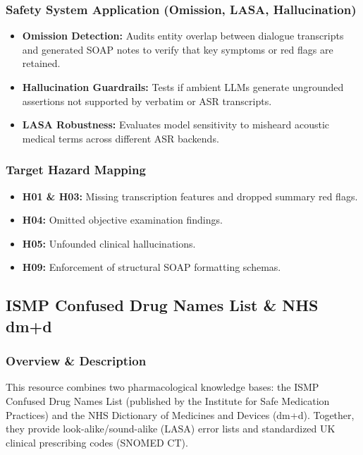 \subsubsection*{Safety System Application (Omission, LASA, Hallucination)}
\begin{itemize}
    \item \textbf{Omission Detection:} Audits entity overlap between dialogue transcripts and generated SOAP notes to verify that key symptoms or red flags are retained.
    \item \textbf{Hallucination Guardrails:} Tests if ambient LLMs generate ungrounded assertions not supported by verbatim or ASR transcripts.
    \item \textbf{LASA Robustness:} Evaluates model sensitivity to misheard acoustic medical terms across different ASR backends.
\end{itemize}

\subsubsection*{Target Hazard Mapping}
\begin{itemize}
    \item \textbf{H01 \& H03:} Missing transcription features and dropped summary red flags.
    \item \textbf{H04:} Omitted objective examination findings.
    \item \textbf{H05:} Unfounded clinical hallucinations.
    \item \textbf{H09:} Enforcement of structural SOAP formatting schemas.
\end{itemize}



\subsection{ISMP Confused Drug Names List \& NHS dm+d}
\label{subsec:ismp\_dmd}

\subsubsection*{Overview \& Description}
This resource combines two pharmacological knowledge bases: the ISMP Confused Drug Names List (published by the Institute for Safe Medication Practices) and the NHS Dictionary of Medicines and Devices (dm+d). Together, they provide look-alike/sound-alike (LASA) error lists and standardized UK clinical prescribing codes (SNOMED CT).

